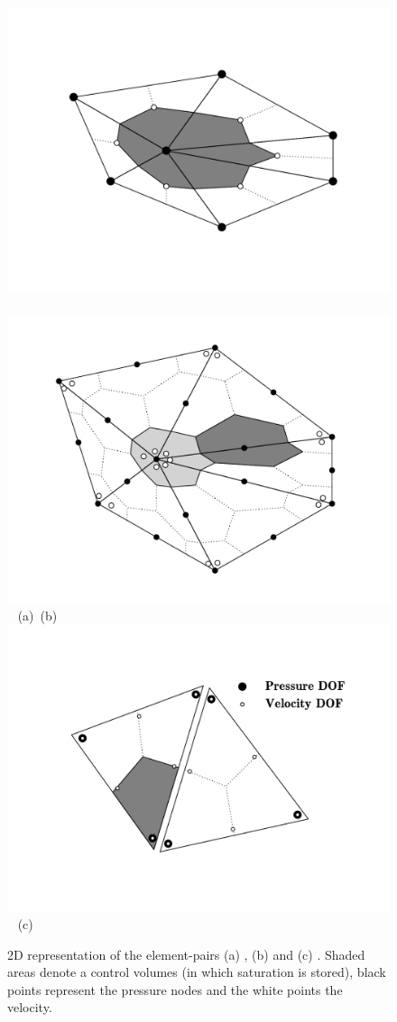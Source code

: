 
\begin{figure}[h]
\vbox{
\hbox{\hspace{-0.5cm}\includegraphics[width=.6\textwidth]{diagrams/p0dgp1-cont-sat} 
\hspace{-.9cm}\includegraphics[width=.6\textwidth]{diagrams/p1dgp2-cont-sat} }
\hbox{\hspace{4cm}(a) \hspace{6.5cm}(b)}
\vspace{0.cm}
\hbox{\hspace{2.5cm}\includegraphics[width=.8\textwidth]{diagrams/p2dgp1-dg-sat} }
\vspace{-0.3cm}
\hbox{\hspace{6cm}(c) }
}
\caption{2D representation of the element-pairs (a) , (b)  and (c) . Shaded areas denote a control volumes (in which saturation is stored), black points represent the pressure nodes and the white points the velocity.}
  \label{fem_cv_represent_a}
\end{figure}

